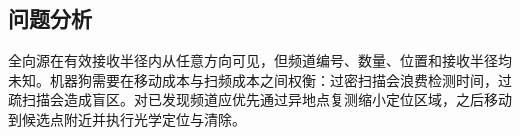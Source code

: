 \subsection{问题分析}

全向源在有效接收半径内从任意方向可见，但频道编号、数量、位置和接收半径均未知。机器狗需要在移动成本与扫频成本之间权衡：过密扫描会浪费检测时间，过疏扫描会造成盲区。对已发现频道应优先通过异地点复测缩小定位区域，之后移动到候选点附近并执行光学定位与清除。
